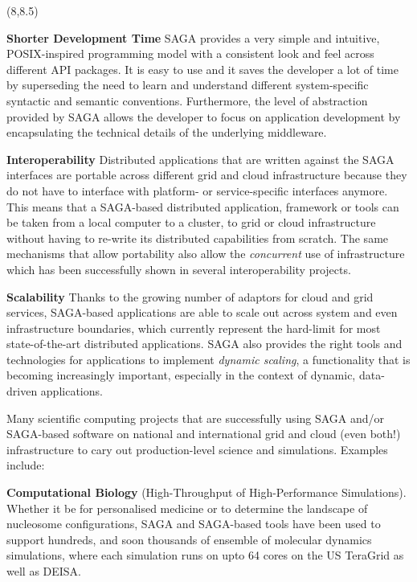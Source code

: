 \documentclass[a0b,portrait]{a0poster}
\def\LHead#1{\bigskip\bigskip\noindent{\huge\color{HeadColor} #1}\smallskip}
\begin{document}
\begin{textblock}{7}(8,8.5)

\LHead{Why Use SAGA?}
\large 

\textbf{\color{DarkBlue} Shorter Development Time} SAGA provides a very simple
and intuitive, POSIX-inspired programming model with a consistent look and
feel across different API packages. It is easy to use and it saves the
developer a lot of time by superseding the need to learn and understand
different system-specific syntactic and semantic conventions. Furthermore, the
level of abstraction provided by SAGA allows the developer to focus on
application development by encapsulating the technical details of the
underlying middleware.

\textbf{\color{DarkBlue} Interoperability} Distributed applications that are
written against the SAGA interfaces are portable across different grid and
cloud infrastructure because they do not have to interface with platform- or
service-specific interfaces anymore. This means that a SAGA-based distributed
application, framework or tools can be taken from a local computer to a
cluster, to grid or cloud infrastructure without having to re-write its
distributed capabilities from scratch. The same mechanisms that allow
portability also allow the \textit{concurrent} use of infrastructure which has
been successfully shown in several interoperability projects. 

\textbf{\color{DarkBlue} Scalability} Thanks to the growing number of adaptors
for cloud and grid services, SAGA-based applications are able to scale out
across system and even infrastructure boundaries, which currently represent
the hard-limit for most state-of-the-art distributed applications. SAGA also
provides the right tools and technologies for applications to implement 
\textit{dynamic scaling}, a functionality that is becoming increasingly 
important, especially in the context of dynamic, data-driven applications.

\large


\LHead{How SAGA is Used}
\large

Many scientific computing projects that are successfully using SAGA and/or
SAGA-based software on national and international grid and cloud (even both!)
infrastructure to cary out production-level science and simulations. Examples
include:

\textbf{\color{DarkBlue} Computational Biology } (High-Throughput of
High-Performance Simulations). Whether it be for personalised medicine
or to determine the landscape of nucleosome configurations, SAGA and
SAGA-based tools have been used to support hundreds, and soon
thousands of ensemble of molecular dynamics simulations, where each
simulation runs on upto 64 cores on the US TeraGrid as well as DEISA.


\end{textblock}
\end{document}
